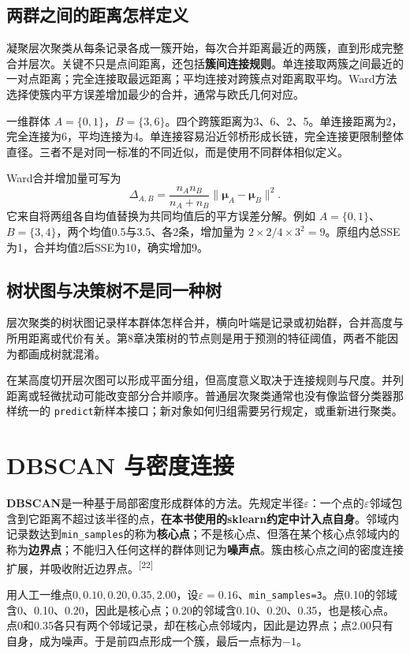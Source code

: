 \subsection{两群之间的距离怎样定义}
凝聚层次聚类从每条记录各成一簇开始，每次合并距离最近的两簇，直到形成完整合并层次。关键不只是点间距离，还包括\textbf{簇间连接规则}。单连接取两簇之间最近的一对点距离；完全连接取最远距离；平均连接对跨簇点对距离取平均。Ward方法选择使簇内平方误差增加最少的合并，通常与欧氏几何对应。

一维群体 $A=\{0,1\}$，$B=\{3,6\}$。四个跨簇距离为3、6、2、5。单连接距离为2，完全连接为6，平均连接为4。单连接容易沿近邻桥形成长链，完全连接更限制整体直径。三者不是对同一标准的不同近似，而是使用不同群体相似定义。

Ward合并增加量可写为
\[
\Delta_{A,B}=\frac{n_An_B}{n_A+n_B}\|\boldsymbol\mu_A-\boldsymbol\mu_B\|^2.
\]
它来自将两组各自均值替换为共同均值后的平方误差分解。例如 $A=\{0,1\}$、$B=\{3,4\}$，两个均值0.5与3.5、各2条，增加量为 $2\times2/4\times3^2=9$。原组内总SSE为1，合并均值2后SSE为10，确实增加9。

\subsection{树状图与决策树不是同一种树}
层次聚类的树状图记录样本群体怎样合并，横向叶端是记录或初始群，合并高度与所用距离或代价有关。第8章决策树的节点则是用于预测的特征阈值，两者不能因为都画成树就混淆。

在某高度切开层次图可以形成平面分组，但高度意义取决于连接规则与尺度。并列距离或轻微扰动可能改变部分合并顺序。普通层次聚类通常也没有像监督分类器那样统一的 \texttt{predict}新样本接口；新对象如何归组需要另行规定，或重新进行聚类。

\section{DBSCAN 与密度连接}

\textbf{DBSCAN}是一种基于局部密度形成群体的方法。先规定半径$\varepsilon$：一个点的$\varepsilon$邻域包含到它距离不超过该半径的点，\textbf{在本书使用的sklearn约定中计入点自身}。邻域内记录数达到\texttt{min\_samples}的称为\textbf{核心点}；不是核心点、但落在某个核心点邻域内的称为\textbf{边界点}；不能归入任何这样的群体则记为\textbf{噪声点}。簇由核心点之间的密度连接扩展，并吸收附近边界点。\textsuperscript{[22]}

用人工一维点$0,0.10,0.20,0.35,2.00$，设$\varepsilon=0.16$、\texttt{min\_samples=3}。点0.10的邻域含0、0.10、0.20，因此是核心点；0.20的邻域含0.10、0.20、0.35，也是核心点。点0和0.35各只有两个邻域记录，却在核心点邻域内，因此是边界点；点2.00只有自身，成为噪声。于是前四点形成一个簇，最后一点标为$-1$。

